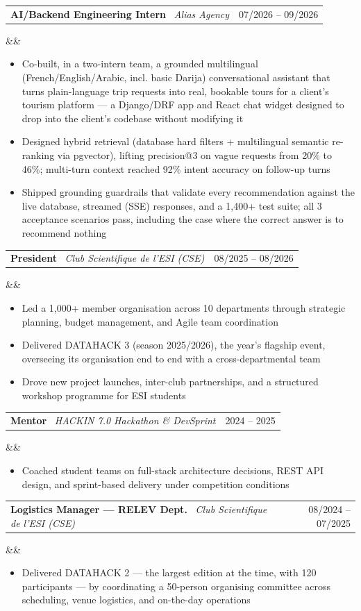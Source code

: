 \documentclass[10pt, a4paper]{article}
\makeatletter
\newcommand{\cventry}[4]{%
  \noindent
  \begin{tabular*}{\linewidth}{@{}l@{\extracolsep{\fill}}r@{}}
    \textbf{#1} \textbullet\ \textit{#2} & \textcolor{textsecondary}{\small #3}
  \end{tabular*}%
  \ifx&#4&\else\\\textcolor{textsecondary}{\small #4}\fi%
  \vspace{1pt}%
}
\makeatother
\begin{document}
\cventry{AI/Backend Engineering Intern}{Alias Agency}{07/2026 -- 09/2026}{}
\begin{itemize}
  \item Co-built, in a two-intern team, a grounded multilingual (French/English/Arabic, incl. basic Darija) conversational assistant that turns plain-language trip requests into real, bookable tours for a client's tourism platform --- a Django/DRF app and React chat widget designed to drop into the client's codebase without modifying it
  \item Designed hybrid retrieval (database hard filters + multilingual semantic re-ranking via pgvector), lifting precision@3 on vague requests from 20\% to 46\%; multi-turn context reached 92\% intent accuracy on follow-up turns
  \item Shipped grounding guardrails that validate every recommendation against the live database, streamed (SSE) responses, and a 1,400+ test suite; all 3 acceptance scenarios pass, including the case where the correct answer is to recommend nothing
\end{itemize}

\vspace{3pt}

\cventry{President}{Club Scientifique de l'ESI (CSE)}{08/2025 -- 08/2026}{}
\begin{itemize}
  \item Led a 1,000+ member organisation across 10 departments through strategic planning, budget management, and Agile team coordination
  \item Delivered DATAHACK 3 (season 2025/2026), the year's flagship event, overseeing its organisation end to end with a cross-departmental team
  \item Drove new project launches, inter-club partnerships, and a structured workshop programme for ESI students
\end{itemize}

\vspace{3pt}

\cventry{Mentor}{HACKIN 7.0 Hackathon \& DevSprint}{2024 -- 2025}{}
\begin{itemize}
  \item Coached student teams on full-stack architecture decisions, REST API design, and sprint-based delivery under competition conditions
\end{itemize}

\vspace{3pt}

\cventry{Logistics Manager --- RELEV Dept.}{Club Scientifique de l'ESI (CSE)}{08/2024 -- 07/2025}{}
\begin{itemize}
  \item Delivered DATAHACK 2 --- the largest edition at the time, with 120 participants --- by coordinating a 50-person organising committee across scheduling, venue logistics, and on-the-day operations
\end{itemize}
\end{document}
